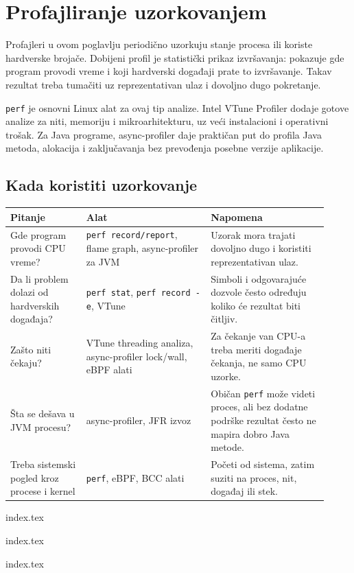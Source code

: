 \section{Profajliranje uzorkovanjem}\label{profajliranje-uzorkovanjem}

Profajleri u ovom poglavlju periodično uzorkuju stanje procesa ili koriste hardverske brojače. Dobijeni profil je statistički prikaz izvršavanja: pokazuje gde program provodi vreme i koji hardverski događaji prate to izvršavanje. Takav rezultat treba tumačiti uz reprezentativan ulaz i dovoljno dugo pokretanje.

\texttt{perf} je osnovni Linux alat za ovaj tip analize. Intel VTune Profiler dodaje gotove analize za niti, memoriju i mikroarhitekturu, uz veći instalacioni i operativni trošak. Za Java programe, async-profiler daje praktičan put do profila Java metoda, alokacija i zaključavanja bez prevođenja posebne verzije aplikacije.

\subsection{Kada koristiti uzorkovanje}\label{kada-koristiti-uzorkovanje}

\begin{longtable}{@{}p{0.22\linewidth}p{0.36\linewidth}p{0.34\linewidth}@{}}
\toprule
Pitanje & Alat & Napomena \\
\midrule
\endhead
Gde program provodi CPU vreme? & \texttt{perf record/report}, flame graph, async-profiler za JVM & Uzorak mora trajati dovoljno dugo i koristiti reprezentativan ulaz. \\
Da li problem dolazi od hardverskih događaja? & \texttt{perf stat}, \texttt{perf record -e}, VTune & Simboli i odgovarajuće dozvole često određuju koliko će rezultat biti čitljiv. \\
Zašto niti čekaju? & VTune threading analiza, async-profiler lock/wall, eBPF alati & Za čekanje van CPU-a treba meriti događaje čekanja, ne samo CPU uzorke. \\
Šta se dešava u JVM procesu? & async-profiler, JFR izvoz & Običan \texttt{perf} može videti proces, ali bez dodatne podrške rezultat često ne mapira dobro Java metode. \\
Treba sistemski pogled kroz procese i kernel & \texttt{perf}, eBPF, BCC alati & Početi od sistema, zatim suziti na proces, nit, događaj ili stek. \\
\bottomrule
\end{longtable}

{index.tex}

{index.tex}

{index.tex}

